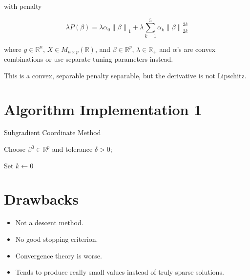 \documentclass[10pt, reqno]{article}
\numberwithin{equation}{section}
\newcommand{\norm}[1]{\left\lVert#1\right\rVert}
\newcommand{\R}{\mathbb{R}}
\begin{document}
with penalty

\[
\lambda P(\beta) = \lambda \alpha_0 \norm{\beta}_1 + \lambda \sum_{k = 1}^{5} \alpha_k \norm{\beta}_{2k}^{2k} 
\]

where $y \in \R^n$, $X \in M_{n \times p}(\R)$, and $\beta \in \R^p$, $\lambda \in \R_{+}$ and $\alpha$'s are convex combinations or use separate tuning parameters instead.

\vspace{1cm}
This is a convex, separable penalty separable, but the derivative is not Lipschitz.

\newpage
\section*{Algorithm Implementation 1}

\vspace{.5cm}
\begin{algorithm}[H]
\caption{Subgradient Coordinate Method}
Choose $\beta^0 \in \R^p$ and tolerance $\delta > 0$;

Set $k \gets 0$


\end{algorithm}

\newpage
\section*{Drawbacks}

\begin{itemize}
\item Not a descent method.

\item No good stopping criterion.

\item Convergence theory is worse.

\item Tends to produce really small values instead of truly sparse solutions.

\end{itemize}
\end{document}
